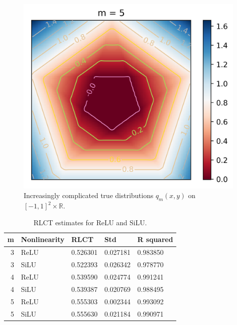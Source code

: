 \documentclass{article} %
\begin{document}
\begin{figure}[h]
\begin{center}
\includegraphics[scale=0.4]{truedist5.png}
\end{center}
\caption{Increasingly complicated true distributions $q_m(x,y)$ on $[-1,1]^2 \times \mathbb{R}$.}
\label{fig:simp_func_complex}
\end{figure}

\begin{table}[h]
	\centering
	\caption{\footnotesize RLCT estimates for ReLU and SiLU.}
	\label{table:hyper}
    \begin{tiny}
    \begin{tabular}
    {r l l l l}
    \toprule
      \textbf{m}  & \textbf{Nonlinearity}  & \textbf{RLCT} & \textbf{Std} & \textbf{R squared}\\ 
    \midrule
    3 & ReLU & 0.526301 & 0.027181 & 0.983850\\
    3 & SiLU & 0.522393 & 0.026342 & 0.978770\\
    4 & ReLU & 0.539590 & 0.024774 & 0.991241\\
    4 & SiLU & 0.539387 & 0.020769 & 0.988495\\
    5 & ReLU & 0.555303 & 0.002344 & 0.993092\\
    5 & SiLU & 0.555630 & 0.021184 & 0.990971\\
   \bottomrule
   \end{tabular}
	\end{tiny}
\end{table}
\end{document}
